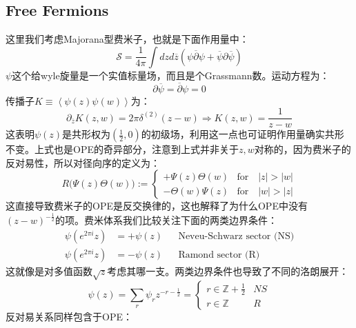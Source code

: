 \subsection{Free Fermions}
这里我们考虑Majorana型费米子，也就是下面作用量中：
\begin{equation}
	\mathcal{S}=\frac1{4\pi}\int dzd\overline{z}\left(\psi\overline{\partial}\psi+\overline{\psi}\partial\overline{\psi}\right)
\end{equation}
$\psi$这个给wyle旋量是一个实值标量场，而且是个Grassmann数。运动方程为：
\begin{equation}
	\partial\overline{\psi}=\overline{\partial}\psi=0
\end{equation}
传播子$K\equiv\left\langle\psi(z)\psi(w)\right\rangle$为：
\begin{equation}
	\partial_{\overline{z}}K(z,w)=2\pi\delta^{(2)}(z-w)\Rightarrow K(z,w)=\frac{1}{z-w}
\end{equation}
这表明$\psi(z)$是共形权为$(\frac{1}{2},0)$的初级场，利用这一点也可证明作用量确实共形不变。上式也是OPE的奇异部分，注意到上式并非关于$z,w$对称的，因为费米子的反对易性，所以对径向序的定义为：
\begin{equation}
	R\big(\Psi(z)\Theta(w)\big):=
	\begin{cases}+\Psi(z)\Theta(w)&\mathrm{for}\quad|z|>|w|\\-\Theta(w)\Psi(z)&\mathrm{for}\quad|w|>|z|\end{cases}
\end{equation}
这直接导致费米子的OPE是反交换律的，这也解释了为什么OPE中没有$(z-w)^{-\frac{1}{2}}$的项。费米体系我们比较关注下面的两类边界条件：
\begin{equation}
	\begin{aligned}\psi(e^{2\pi i}z)&=+\psi(z)&&\text{Neveu-Schwarz sector (NS)}\\\psi(e^{2\pi i}z)&=-\psi(z)&&\text{Ramond sector (R)}\end{aligned}
\end{equation}
这就像是对多值函数$\sqrt{z}$考虑其哪一支。两类边界条件也导致了不同的洛朗展开：
\begin{equation}
	\psi(z)=\sum_r\psi_rz^{-r-\frac12}=\begin{cases}r\in\mathbb{Z}+\frac1{2}&NS\\r\in\mathbb{Z}&R\end{cases}
\end{equation}
反对易关系同样包含于OPE：
